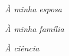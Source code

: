 \begin{dedicatoria}
   \vspace*{\fill}
   \begin{flushright}
   \textit{À minha esposa}
   
   \textit{À minha família}
   
   \textit{À ciência}
   \end{flushright}

   
   
\end{dedicatoria}
